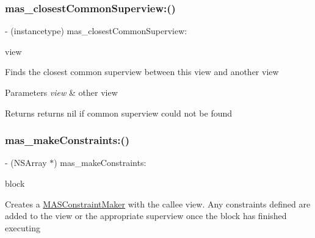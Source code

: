 \subsubsection{\texorpdfstring{mas\+\_\+closest\+Common\+Superview\+:()}{mas\_closestCommonSuperview:()}}
{\footnotesize\ttfamily -\/ (instancetype) mas\+\_\+closest\+Common\+Superview\+: \begin{DoxyParamCaption}\item[{(M\+A\+S\+\_\+\+V\+I\+EW $\ast$)}]{view }\end{DoxyParamCaption}}

Finds the closest common superview between this view and another view


\begin{DoxyParams}{Parameters}
{\em view} & other view\\
\hline
\end{DoxyParams}
\begin{DoxyReturn}{Returns}
returns nil if common superview could not be found 
\end{DoxyReturn}
\mbox{\label{category_m_a_s___v_i_e_w_07_m_a_s_additions_08_adc79101b45c8547ac63faf1ee3c81057}} 
\subsubsection{\texorpdfstring{mas\+\_\+make\+Constraints\+:()}{mas\_makeConstraints:()}}
{\footnotesize\ttfamily -\/ (N\+S\+Array $\ast$) mas\+\_\+make\+Constraints\+: \begin{DoxyParamCaption}\item[{(void($^\wedge$)(\mbox{\hyperlink{interface_m_a_s_constraint_maker}{M\+A\+S\+Constraint\+Maker}} $\ast$make))}]{block }\end{DoxyParamCaption}}

Creates a \mbox{\hyperlink{interface_m_a_s_constraint_maker}{M\+A\+S\+Constraint\+Maker}} with the callee view. Any constraints defined are added to the view or the appropriate superview once the block has finished executing



